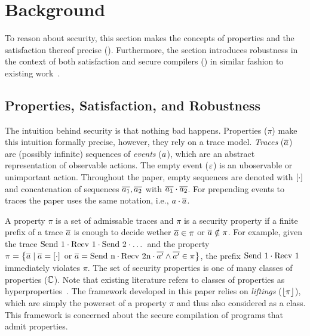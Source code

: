 \documentclass[utf8,acmsmall,review,screen,dvipsnames]{acmart}
\begin{document}
\section{Background}\label{sec:background}
To reason about security, this section makes the concepts of properties and the satisfaction thereof precise ().
Furthermore, the section introduces robustness in the context of both satisfaction and secure compilers () in similar fashion to existing work~\cite{abate2019jour}.

\subsection{Properties, Satisfaction, and Robustness}\label{subsec:bg:tprop}

The intuition behind security is that nothing bad happens.
Properties ($\pi$) make this intuition formally precise, however, they rely on a trace model.
{\em Traces} ($\trace$) are (possibly infinite) sequences of {\em events} ($\event$), which are an abstract representation of observable actions.
The empty event ($\emptyevent$) is an uboservable or unimportant action.
Throughout the paper, empty sequences are denoted with $\hole{\cdot}$ and concatenation of sequences $\trace[_{1}],\trace[_{2}]$ with $\trace[_{1}]\cdot\trace[_{2}]$.
For prepending events to traces the paper uses the same notation, i.e., $\event\cdot\trace$.

A property $\pi$ is a set of admissable traces and $\pi$ is a security property if a finite prefix of a trace $\trace$ is enough to decide wether $\trace\in\pi$ or $\trace\notin\pi$.
For example, given the trace $\ev{Send\ 1}\cdot\ev{Recv\ 1}\cdot\ev{Send\ 2}\cdot\dots$ and the property $\pi=\left\{\trace \mid \trace=\hole{\cdot} \text{ or } \trace=\ev{Send\ n}\cdot\ev{Recv\ 2n}\cdot\trace[']\wedge \trace[']\in\pi\right\}$, the prefix $\ev{Send\ 1}\cdot\ev{Recv\ 1}$ immediately violates $\pi$.
The set of security properties is one of many classes of properties ($\class$).
Note that existing literature refers to classes of properties as hyperproperties~\cite{clarkson2008hyper}.
The framework developed in this paper relies on {\em liftings} ($\lift{\pi}$), which are simply the powerset of a property $\pi$ and thus also considered as a class.
This framework is concerned about the secure compilation of programs that admit properties.
\end{document}
